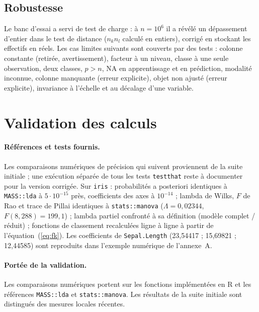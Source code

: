 \documentclass[10.5pt,a4paper]{article}
\newcommand{\code}[1]{\texttt{#1}}
\begin{document}
\subsection{Robustesse}
Le banc d'essai a servi de test de charge : \`a $n=10^6$ il a r\'ev\'el\'e un d\'epassement d'entier dans le test de distance ($n_kn_l$ calcul\'e en entiers), corrig\'e en stockant les effectifs en r\'eels. Les cas limites suivants sont couverts par des tests : colonne constante (retir\'ee, avertissement), facteur \`a un niveau, classe \`a une seule observation, deux classes, $p>n$, NA en apprentissage et en pr\'ediction, modalit\'e inconnue, colonne manquante (erreur explicite), objet non ajust\'e (erreur explicite), invariance \`a l'\'echelle et au d\'ecalage d'une variable.

\section{Validation des calculs}
\paragraph{R\'ef\'erences et tests fournis.} Les comparaisons num\'eriques de pr\'ecision qui suivent proviennent de la suite initiale ; une ex\'ecution s\'epar\'ee de tous les tests \code{testthat} reste \`a documenter pour la version corrig\'ee. Sur \code{iris} : probabilit\'es a posteriori identiques \`a \code{MASS::lda} \`a $5\cdot10^{-15}$ pr\`es, coefficients des axes \`a $10^{-14}$ ; lambda de Wilks, $F$ de Rao et trace de Pillai identiques \`a \code{stats::manova} ($\Lambda=0{,}02344$, $F(8,288)=199{,}1$) ; lambda partiel confront\'e \`a sa d\'efinition (mod\`ele complet / r\'eduit) ; fonctions de classement recalcul\'ees ligne \`a ligne \`a partir de l'\'equation~(\ref{eq:fk}). Les coefficients de \code{Sepal.Length} (23,54417 ; 15,69821 ; 12,44585) sont reproduits dans l'exemple num\'erique de l'annexe~A.

\paragraph{Port\'ee de la validation.} Les comparaisons num\'eriques portent sur les fonctions impl\'ement\'ees en R et les r\'ef\'erences \code{MASS::lda} et \code{stats::manova}. Les r\'esultats de la suite initiale sont distingu\'es des mesures locales r\'ecentes.
\end{document}
